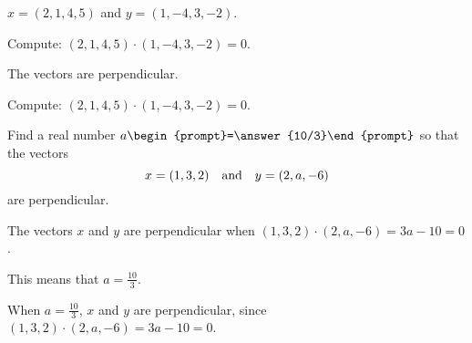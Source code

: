 \documentclass{ximera}
\begin{document}
\begin{exercise} \label{c1.4.1c}
  $x=(2,1,4,5)$ and $y=(1,-4,3,-2)$.
    \begin{multipleChoice}
  \end{multipleChoice}
  \begin{hint}
    Compute: $(2,1,4,5) \cdot (1,-4,3,-2) = 0$.
  \end{hint}

\begin{solution}
\ans The vectors are perpendicular.

\soln Compute: $(2,1,4,5) \cdot (1,-4,3,-2) = 0$.

\end{solution}
\end{exercise}


\begin{exercise} \label{c1.4.2}
Find a real number $a\begin{prompt}=\answer{10/3}\end{prompt}$ so that the vectors
\[
x = (1,3,2) \quad\mbox{and}\quad y = (2,a,-6)
\]
are perpendicular.
\begin{hint}
  The vectors $x$ and $y$ are perpendicular when
$(1,3,2) \cdot (2,a,-6) = 3a - 10 = 0$.
\end{hint}
\begin{hint}
  This means that $a = \frac{10}{3}$.
\end{hint}

\begin{solution}

When $a = \frac{10}{3}$, $x$ and $y$ are perpendicular, since
$(1,3,2) \cdot (2,a,-6) = 3a - 10 = 0$.

\end{solution}
\end{exercise}
\end{document}
